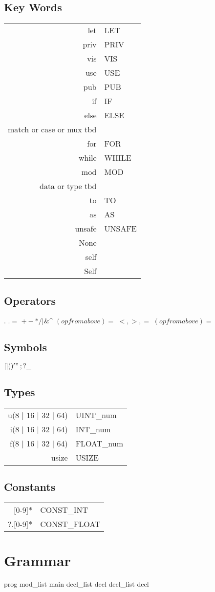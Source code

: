 \documentclass{article}
\begin{document}
		\subsection{Key Words}
			\begin{tabular}{rl}
				let & LET\\
				priv & PRIV\\
				vis & VIS\\
				use & USE\\
				pub & PUB\\
				if & IF\\
				else & ELSE\\ 
				match or case or mux tbd & \\
				for & FOR\\
				while & WHILE\\
				mod & MOD\\
				data or type tbd & \\
				to & TO\\
				as & AS\\
				unsafe & UNSAFE\\
				None & \\
				self & \\
				Self & \\
			\end{tabular}
		\subsection{Operators}
			$.$
			$.=$
			$+ - * / | \& \^$
			$(op from above)=$
			$<, >, =$
			$(op from above)=$
		\subsection{Symbols}
			$[ ]
			( )
			{ }
			' "
			\: ;
			? \_$
		\subsection{Types}	
			\begin{tabular}{rl}
				u(8 | 16 | 32 | 64) & UINT\_num\\
				i(8 | 16 | 32 | 64) & INT\_num\\
				f(8 | 16 | 32 | 64) & FLOAT\_num\\
				usize & USIZE\\ 
			\end{tabular}
		\subsection{Constants}
			\begin{tabular}{rl}
				[0-9]* & CONST\_INT\\
				[0-9]?.[0-9]* & CONST\_FLOAT\\
			\end{tabular}
	\section{Grammar}
		prog
			mod\_list main 
		decl\_list
			decl decl\_list 
		decl 
\end{document}
